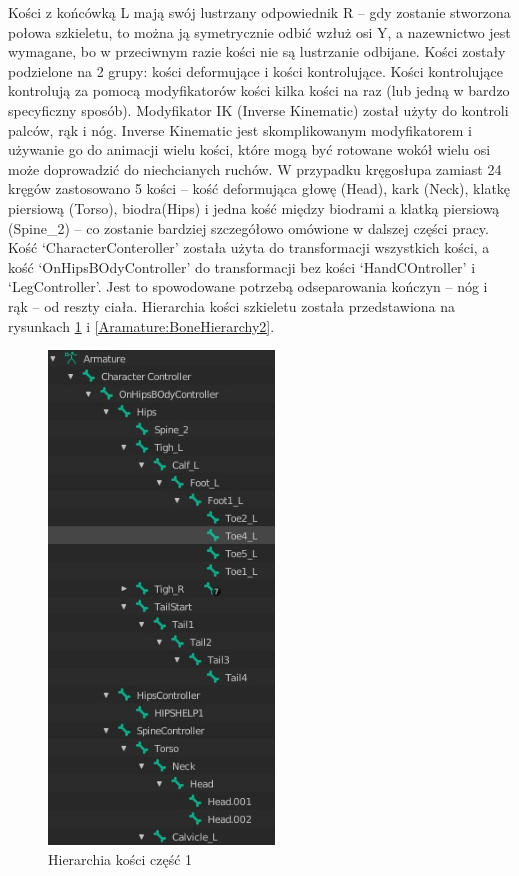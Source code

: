 \documentclass[12pt,twoside]{article}
\begin{document}
Kości z końcówką L mają swój lustrzany odpowiednik R -- gdy zostanie stworzona
połowa szkieletu, to można ją symetrycznie odbić wzłuż osi Y, a nazewnictwo jest
wymagane, bo w przeciwnym razie kości nie są lustrzanie odbijane. Kości zostały
podzielone na 2 grupy: kości deformujące i kości kontrolujące. Kości
kontrolujące kontrolują za pomocą modyfikatorów kości kilka kości na raz (lub
jedną w bardzo specyficzny sposób). Modyfikator IK (Inverse Kinematic) został
użyty do kontroli palców, rąk i nóg. Inverse Kinematic jest skomplikowanym
modyfikatorem i używanie go do animacji wielu kości, które mogą być rotowane
wokół wielu osi może doprowadzić do niechcianych ruchów. W przypadku kręgosłupa
zamiast 24 kręgów zastosowano 5 kości -- kość deformująca głowę (Head), kark
(Neck),  klatkę piersiową (Torso), biodra(Hips) i jedna kość między biodrami a
klatką piersiową (Spine\_2) -- co zostanie bardziej szczegółowo omówione w
dalszej części pracy. Kość `CharacterConteroller' została użyta do transformacji
wszystkich kości, a kość `OnHipsBOdyController' do transformacji bez kości
`HandCOntroller' i `LegController'. Jest to spowodowane potrzebą odseparowania
kończyn -- nóg i rąk -- od reszty ciała. Hierarchia kości szkieletu została
przedstawiona na rysunkach
\ref{Aramature:BoneHierarchy1} i \ref{Aramature:BoneHierarchy2}.
\begin{figure}[hbt!]

    \centering
	\includegraphics[width=6cm]{RealizacjaProjektu/MC/BoneHierarchy1.jpg}
	\caption{Hierarchia kości część 1}
    \label{Aramature:BoneHierarchy1}
\end{figure}
\end{document}
